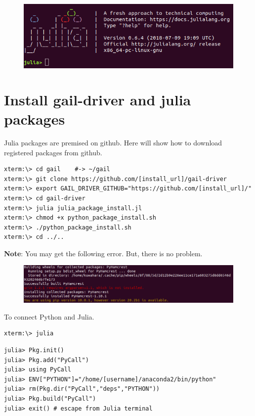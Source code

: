 \documentclass[openany,11pt]{report}%
\begin{document}
\begin{figure}[h]
    \centering
    \includegraphics[width=\textwidth]{img/julia.png}
    \label{fig: 2DMOT2015}
\end{figure}



\section{Install gail-driver and julia packages}

Julia packages are premised on github.
Here will show how to download registered packages from github.

\begin{lstlisting}[style=DOS]
xterm:\> cd gail    #-> ~/gail
xterm:\> git clone https://github.com/[install_url]/gail-driver
xterm:\> export GAIL_DRIVER_GITHUB="https://github.com/[install_url]/"
xterm:\> cd gail-driver
xterm:\> julia julia_package_install.jl
xterm:\> chmod +x python_package_install.sh
xterm:\> ./python_package_install.sh
xterm:\> cd ../..
\end{lstlisting}

{\bf Note}: You may get the following error. But, there is no problem.

\begin{figure}[H]
    \centering
    \includegraphics[width=\textwidth]{img/error.png}
\end{figure}

To connect Python and Julia.

\begin{lstlisting}[style=DOS]
xterm:\> julia
\end{lstlisting}
\begin{lstlisting}[style=DOS]
julia> Pkg.init()
julia> Pkg.add("PyCall") 
julia> using PyCall
julia> ENV["PYTHON"]="/home/[username]/anaconda2/bin/python"
julia> rm(Pkg.dir("PyCall","deps","PYTHON"))
julia> Pkg.build("PyCall")
julia> exit() # escape from Julia terminal 
\end{lstlisting}
\end{document}
